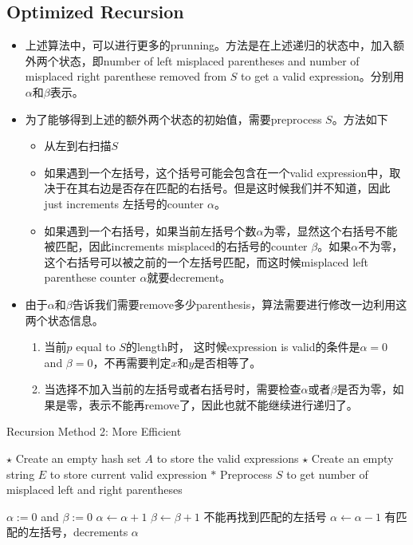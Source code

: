 \subsection{Optimized Recursion}
\begin{itemize}
\item 上述算法中，可以进行更多的prunning。方法是在上述递归的状态中，加入额外两个状态，即number of left misplaced parentheses and number of misplaced right parenthese removed from $S$ to get a valid expression。分别用$\alpha$和$\beta$表示。
\item 为了能够得到上述的额外两个状态的初始值，需要preprocess $S$。方法如下
\begin{itemize}
\item 从左到右扫描$S$
\item 如果遇到一个左括号，这个括号可能会包含在一个valid expression中，取决于在其右边是否存在匹配的右括号。但是这时候我们并不知道，因此just increments 左括号的counter $\alpha$。
\item 如果遇到一个右括号，如果当前左括号个数$\alpha$为零，显然这个右括号不能被匹配，因此increments misplaced的右括号的counter $\beta$。如果$\alpha$不为零，这个右括号可以被之前的一个左括号匹配，而这时候misplaced left parenthese counter $\alpha$就要decrement。
\end{itemize}
\item 由于$\alpha$和$\beta$告诉我们需要remove多少parenthesis，算法需要进行修改一边利用这两个状态信息。
\begin{enumerate}
\item 当前$p$ equal to $S$的length时， 这时候expression is valid的条件是$\alpha=0$ and $\beta=0$，不再需要判定$x$和$y$是否相等了。
\item 当选择不加入当前的左括号或者右括号时，需要检查$\alpha$或者$\beta$是否为零，如果是零，表示不能再remove了，因此也就不能继续进行递归了。
\end{enumerate}
\end{itemize}
\begin{algorithm}[H]
	\caption{Recursion Method 2: More Efficient}
	\begin{algorithmic}[1]
		\State $\star$ Create an empty hash set $A$ to store the valid expressions
		\State $\star$ Create an empty string $E$ to store current valid expression
		\State $\ast$ Preprocess $S$ to get number of misplaced left and right parentheses
				\end{algorithmic}
			\end{algorithm}
		\begin{algorithm}[H]
			\begin{algorithmic}[1]
		\State $\alpha:=0$ and $\beta:=0$
		\State $\alpha\gets\alpha+1$
		\State $\beta\gets\beta+1$ \Comment 不能再找到匹配的左括号
		\Else
		\State $\alpha\gets\alpha-1$ \Comment 有匹配的左括号，decrements $\alpha$
		\EndIf
		\EndIf
		\EndFor
		\State {}
		\EndProcedure
	\end{algorithmic}
\end{algorithm}
